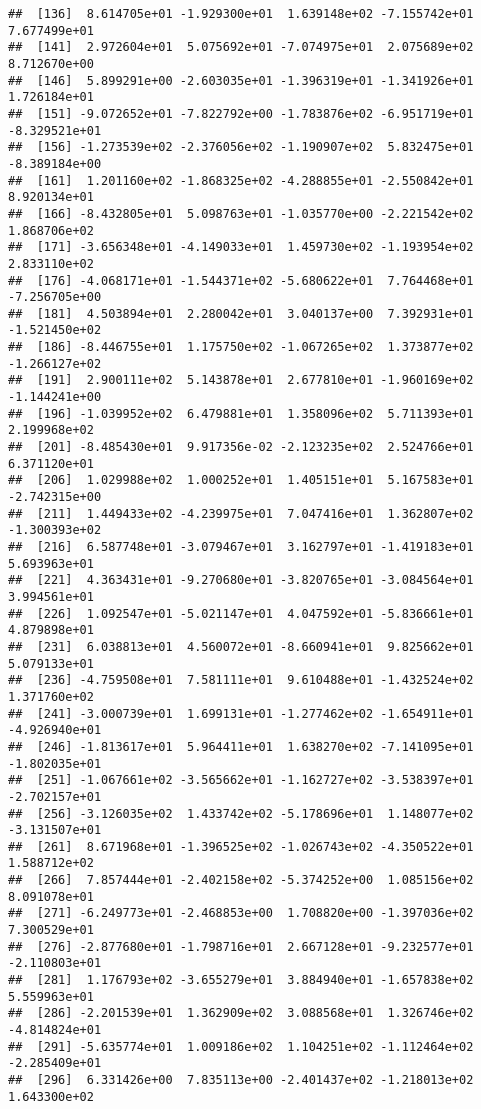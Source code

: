 \documentclass[]{book}
\begin{document}
\begin{verbatim}
##  [136]  8.614705e+01 -1.929300e+01  1.639148e+02 -7.155742e+01  7.677499e+01
##  [141]  2.972604e+01  5.075692e+01 -7.074975e+01  2.075689e+02  8.712670e+00
##  [146]  5.899291e+00 -2.603035e+01 -1.396319e+01 -1.341926e+01  1.726184e+01
##  [151] -9.072652e+01 -7.822792e+00 -1.783876e+02 -6.951719e+01 -8.329521e+01
##  [156] -1.273539e+02 -2.376056e+02 -1.190907e+02  5.832475e+01 -8.389184e+00
##  [161]  1.201160e+02 -1.868325e+02 -4.288855e+01 -2.550842e+01  8.920134e+01
##  [166] -8.432805e+01  5.098763e+01 -1.035770e+00 -2.221542e+02  1.868706e+02
##  [171] -3.656348e+01 -4.149033e+01  1.459730e+02 -1.193954e+02  2.833110e+02
##  [176] -4.068171e+01 -1.544371e+02 -5.680622e+01  7.764468e+01 -7.256705e+00
##  [181]  4.503894e+01  2.280042e+01  3.040137e+00  7.392931e+01 -1.521450e+02
##  [186] -8.446755e+01  1.175750e+02 -1.067265e+02  1.373877e+02 -1.266127e+02
##  [191]  2.900111e+02  5.143878e+01  2.677810e+01 -1.960169e+02 -1.144241e+00
##  [196] -1.039952e+02  6.479881e+01  1.358096e+02  5.711393e+01  2.199968e+02
##  [201] -8.485430e+01  9.917356e-02 -2.123235e+02  2.524766e+01  6.371120e+01
##  [206]  1.029988e+02  1.000252e+01  1.405151e+01  5.167583e+01 -2.742315e+00
##  [211]  1.449433e+02 -4.239975e+01  7.047416e+01  1.362807e+02 -1.300393e+02
##  [216]  6.587748e+01 -3.079467e+01  3.162797e+01 -1.419183e+01  5.693963e+01
##  [221]  4.363431e+01 -9.270680e+01 -3.820765e+01 -3.084564e+01  3.994561e+01
##  [226]  1.092547e+01 -5.021147e+01  4.047592e+01 -5.836661e+01  4.879898e+01
##  [231]  6.038813e+01  4.560072e+01 -8.660941e+01  9.825662e+01  5.079133e+01
##  [236] -4.759508e+01  7.581111e+01  9.610488e+01 -1.432524e+02  1.371760e+02
##  [241] -3.000739e+01  1.699131e+01 -1.277462e+02 -1.654911e+01 -4.926940e+01
##  [246] -1.813617e+01  5.964411e+01  1.638270e+02 -7.141095e+01 -1.802035e+01
##  [251] -1.067661e+02 -3.565662e+01 -1.162727e+02 -3.538397e+01 -2.702157e+01
##  [256] -3.126035e+02  1.433742e+02 -5.178696e+01  1.148077e+02 -3.131507e+01
##  [261]  8.671968e+01 -1.396525e+02 -1.026743e+02 -4.350522e+01  1.588712e+02
##  [266]  7.857444e+01 -2.402158e+02 -5.374252e+00  1.085156e+02  8.091078e+01
##  [271] -6.249773e+01 -2.468853e+00  1.708820e+00 -1.397036e+02  7.300529e+01
##  [276] -2.877680e+01 -1.798716e+01  2.667128e+01 -9.232577e+01 -2.110803e+01
##  [281]  1.176793e+02 -3.655279e+01  3.884940e+01 -1.657838e+02  5.559963e+01
##  [286] -2.201539e+01  1.362909e+02  3.088568e+01  1.326746e+02 -4.814824e+01
##  [291] -5.635774e+01  1.009186e+02  1.104251e+02 -1.112464e+02 -2.285409e+01
##  [296]  6.331426e+00  7.835113e+00 -2.401437e+02 -1.218013e+02  1.643300e+02

\end{verbatim}
\end{document}
